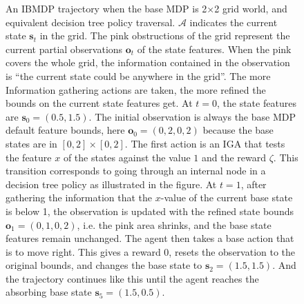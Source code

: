 \begin{figure}[h]
\caption{An IBMDP trajectory when the base MDP is 2$\times$2 grid world, and equivalent decision tree policy traversal.
$\mathcal{A}$ indicates the current state $\boldsymbol{s}_t$ in the grid.
The pink obstructions of the grid represent the current partial observations $\boldsymbol{o}_t$ of the state features.
When the pink covers the whole grid, the information contained in the observation is ``the current state could be anywhere in the grid''.
The more Information gathering actions are taken, the more refined the bounds on the current state features get.
At $t=0$, the state features are $\boldsymbol{s}_0 = (0.5, 1.5)$. 
The initial observation is always the base MDP default feature bounds, here $\boldsymbol{o}_0=(0, 2, 0, 2)$ because the base states are in $[0, 2] \times [0, 2]$.
The first action is an IGA that tests the feature $x$ of the states against the value $1$ and the reward $\zeta$. 
This transition corresponds to going through an internal node in a decision tree policy as illustrated in the figure. 
At $t=1$, after gathering the information that the $x$-value of the current base state is below 1, the observation is updated with the refined state bounds $\boldsymbol{o}_1=(0, 1, 0, 2)$, i.e. the pink area shrinks, and the base state features remain unchanged.
The agent then takes a base action that is to move right. 
This gives a reward 0, resets the observation to the original bounds, and changes the base state to $\boldsymbol{s}_2=(1.5, 1.5)$. And the trajectory continues like this until the agent reaches the absorbing base state $\boldsymbol{s}_5=(1.5, 0.5)$.}
\label{example:ibmdp}
\end{figure}

